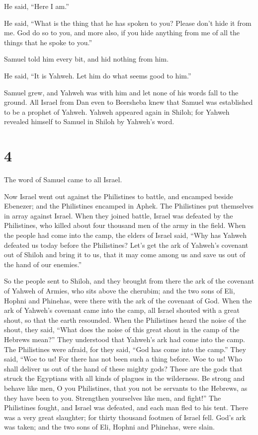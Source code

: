 He said, ``Here I am.''

 He said, ``What is the thing that he has spoken to you?
Please don't hide it from me. God do so to you, and more also, if you
hide anything from me of all the things that he spoke to you.''

 Samuel told him every bit, and hid nothing from him.

He said, ``It is Yahweh. Let him do what seems good to him.''

 Samuel grew, and Yahweh was with him and let none of his
words fall to the ground.  All Israel from Dan even to
Beersheba knew that Samuel was established to be a prophet of Yahweh.
 Yahweh appeared again in Shiloh; for Yahweh revealed
himself to Samuel in Shiloh by Yahweh's word.

\hypertarget{section-3}{%
\section{4}\label{section-3}}

 The word of Samuel came to all Israel.

Now Israel went out against the Philistines to battle, and encamped
beside Ebenezer; and the Philistines encamped in Aphek.  The
Philistines put themselves in array against Israel. When they joined
battle, Israel was defeated by the Philistines, who killed about four
thousand men of the army in the field.  When the people had
come into the camp, the elders of Israel said, ``Why has Yahweh defeated
us today before the Philistines? Let's get the ark of Yahweh's covenant
out of Shiloh and bring it to us, that it may come among us and save us
out of the hand of our enemies.''

 So the people sent to Shiloh, and they brought from there
the ark of the covenant of Yahweh of Armies, who sits above the
cherubim; and the two sons of Eli, Hophni and Phinehas, were there with
the ark of the covenant of God.  When the ark of Yahweh's
covenant came into the camp, all Israel shouted with a great shout, so
that the earth resounded.  When the Philistines heard the
noise of the shout, they said, ``What does the noise of this great shout
in the camp of the Hebrews mean?'' They understood that Yahweh's ark had
come into the camp.  The Philistines were afraid, for they
said, ``God has come into the camp.'' They said, ``Woe to us! For there
has not been such a thing before.  Woe to us! Who shall
deliver us out of the hand of these mighty gods? These are the gods that
struck the Egyptians with all kinds of plagues in the wilderness.
 Be strong and behave like men, O you Philistines, that you
not be servants to the Hebrews, as they have been to you. Strengthen
yourselves like men, and fight!''  The Philistines fought,
and Israel was defeated, and each man fled to his tent. There was a very
great slaughter; for thirty thousand footmen of Israel fell.
 God's ark was taken; and the two sons of Eli, Hophni and
Phinehas, were slain.

